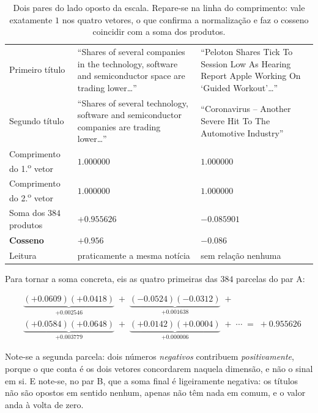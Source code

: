 \begin{table}[ht]
\caption[O cosseno entre dois títulos reais]{Dois pares do lado oposto da escala. Repare-se na
linha do comprimento: vale exatamente $1$ nos quatro vetores, o que confirma a normalização e faz o
cosseno coincidir com a soma dos produtos.}
\label{tab:met_cosseno}
\centering
\small
\begin{tabular}{L{0.26\textwidth} L{0.30\textwidth} L{0.30\textwidth}}
\toprule
 &  &  \\
\midrule
Primeiro título & ``Shares of several companies in the technology, software and semiconductor
space are trading lower\ldots'' & ``Peloton Shares Tick To Session Low As Hearing Report Apple
Working On `Guided Workout'\ldots'' \\
\addlinespace
Segundo título & ``Shares of several technology, software and semiconductor companies are
trading lower\ldots'' & ``Coronavirus – Another Severe Hit To The Automotive Industry'' \\
\midrule
Comprimento do 1.\textsuperscript{o} vetor & $1.000000$ & $1.000000$ \\
Comprimento do 2.\textsuperscript{o} vetor & $1.000000$ & $1.000000$ \\
Soma dos $384$ produtos & $+0.955626$ & $-0.085901$ \\
\midrule
\textbf{Cosseno} & $\mathbf{+0.956}$ & $\mathbf{-0.086}$ \\
Leitura & praticamente a mesma notícia & sem relação nenhuma \\
\bottomrule
\end{tabular}
\end{table}

Para tornar a soma concreta, eis as quatro primeiras das $384$ parcelas do par A:

\begin{equation*}
\begin{aligned}
  &\underbrace{(+0.0609)(+0.0418)}_{+0.002546} \;+\;
   \underbrace{(-0.0524)(-0.0312)}_{+0.001638} \;+\; \\[4pt]
  &\underbrace{(+0.0584)(+0.0648)}_{+0.003779} \;+\;
   \underbrace{(+0.0142)(+0.0004)}_{+0.000006} \;+\; \cdots \;=\; +0.955626
\end{aligned}
\end{equation*}

Note-se a segunda parcela: dois números \emph{negativos} contribuem \emph{positivamente}, porque o
que conta é os dois vetores concordarem naquela dimensão, e não o sinal em si. E note-se, no par B,
que a soma final é ligeiramente negativa: os títulos não são opostos em sentido nenhum, apenas não
têm nada em comum, e o valor anda à volta de zero.

